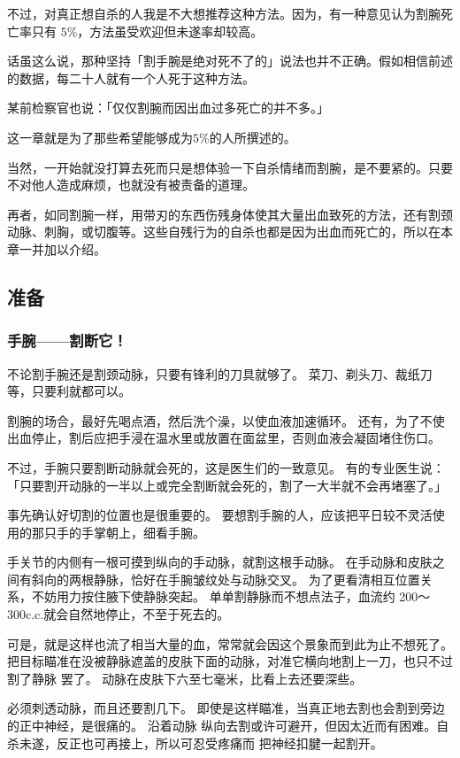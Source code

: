 \documentclass[UTF8]{ctexart}
\begin{document}
不过，对真正想自杀的人我是不大想推荐这种方法。因为，有一种意见认为割腕死亡率只有 $5\%$，方法虽受欢迎但未遂率却较高。

话虽这么说，那种坚持「割手腕是绝对死不了的」说法也并不正确。假如相信前述的数据，每二十人就有一个人死于这种方法。

某前检察官也说：「仅仅割腕而因出血过多死亡的并不多。」

这一章就是为了那些希望能够成为$5\%$的人所撰述的。

当然，一开始就没打算去死而只是想体验一下自杀情绪而割腕，是不要紧的。只要不对他人造成麻烦，也就没有被责备的道理。

再者，如同割腕一样，用带刃的东西伤残身体使其大量出血致死的方法，还有割颈动脉、刺胸，或切腹等。这些自残行为的自杀也都是因为出血而死亡的，所以在本章一并加以介绍。

\subsection{准备}

\subsubsection*{手腕——割断它！}

不论割手腕还是割颈动脉，只要有锋利的刀具就够了。
菜刀、剃头刀、裁纸刀等，只要利就都可以。

割腕的场合，最好先喝点酒，然后洗个澡，以使血液加速循环。
还有，为了不使出血停止，割后应把手浸在温水里或放置在面盆里，否则血液会凝固堵住伤口。

不过，手腕只要割断动脉就会死的，这是医生们的一致意见。
有的专业医生说：「只要割开动脉的一半以上或完全割断就会死的，割了一大半就不会再堵塞了。」

事先确认好切割的位置也是很重要的。
要想割手腕的人，应该把平日较不灵活使用的那只手的手掌朝上，细看手腕。

手关节的内侧有一根可摸到纵向的手动脉，就割这根手动脉。
在手动脉和皮肤之间有斜向的两根静脉，恰好在手腕皱纹处与动脉交叉。
为了更看清相互位置关系，不妨用力按住腋下使静脉突起。
单单割静脉而不想点法子，血流约 200～300c.c.就会自然地停止，不至于死去的。

可是，就是这样也流了相当大量的血，常常就会因这个景象而到此为止不想死了。
把目标瞄准在没被静脉遮盖的皮肤下面的动脉，对准它横向地割上一刀，也只不过割了静脉 罢了。
动脉在皮肤下六至七毫米，比看上去还要深些。

必须刺透动脉，而且还要割几下。
即使是这样瞄准，当真正地去割也会割到旁边的正中神经，是很痛的。
沿着动脉 纵向去割或许可避开，但因太近而有困难。自杀未遂，反正也可再接上，所以可忍受疼痛而 把神经扣腱一起割开。
\end{document}
